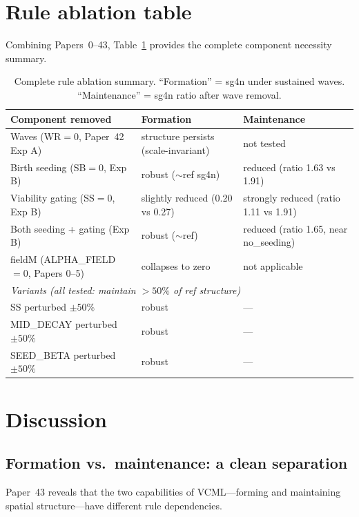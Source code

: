 \documentclass[11pt,a4paper]{article}
\begin{document}
\section{Rule ablation table}

Combining Papers~0--43, Table~\ref{tab:ablation} provides the complete component
necessity summary.

\begin{table}[h]
\centering
\caption{Complete rule ablation summary. ``Formation'' = sg4n under sustained waves.
``Maintenance'' = sg4n ratio after wave removal.}
\label{tab:ablation}
\begin{tabular}{lll}
\toprule
\textbf{Component removed} & \textbf{Formation} & \textbf{Maintenance}\\
\midrule
Waves (WR$=0$, Paper~42 Exp A)        & structure persists (scale-invariant) & not tested\\
Birth seeding (SB$=0$, Exp B)         & robust ($\sim$ref sg4n)              & reduced (ratio 1.63 vs 1.91)\\
Viability gating (SS$=0$, Exp B)      & slightly reduced (0.20 vs 0.27)      & strongly reduced (ratio 1.11 vs 1.91)\\
Both seeding + gating (Exp B)         & robust ($\sim$ref)                   & reduced (ratio 1.65, near no\_seeding)\\
fieldM (ALPHA\_FIELD$=0$, Papers 0--5)& collapses to zero                    & not applicable\\
\midrule
\multicolumn{3}{l}{\textit{Variants (all tested: maintain $>50\%$ of ref structure)}}\\
SS perturbed $\pm50\%$        & robust & --- \\
MID\_DECAY perturbed $\pm50\%$ & robust & --- \\
SEED\_BETA perturbed $\pm50\%$ & robust & --- \\
\bottomrule
\end{tabular}
\end{table}

\section{Discussion}

\subsection{Formation vs.\ maintenance: a clean separation}

Paper~43 reveals that the two capabilities of VCML---forming and maintaining spatial
structure---have different rule dependencies.
\end{document}
